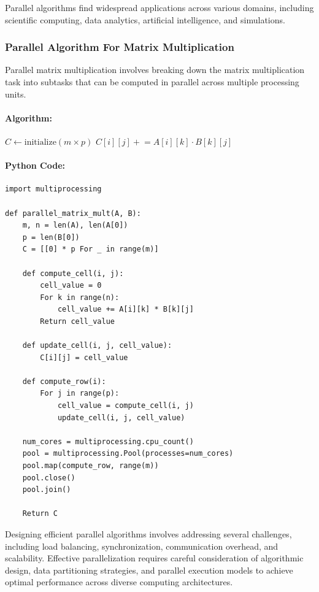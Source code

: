 \documentclass[12pt]{book} %
\begin{document}
Parallel algorithms find widespread applications across various domains, including scientific computing, data analytics, artificial intelligence, and simulations. 
\subsubsection{Parallel Algorithm For Matrix Multiplication}
\FloatBarrier
Parallel matrix multiplication involves breaking down the matrix multiplication task into subtasks that can be computed in parallel across multiple processing units.
\FloatBarrier
\paragraph{Algorithm:}
\FloatBarrier

\begin{algorithm}
\caption{Parallel Matrix Multiplication}
\begin{algorithmic}

    \State $C \gets \text{initialize}(m \times p)$
                \State $C[i][j] \mathrel{+}= A[i][k] \cdot B[k][j]$
            \EndFor
        \EndFor
    \EndFor
\EndFunction
\end{algorithmic}
\end{algorithm}
\FloatBarrier
\paragraph{Python Code:}
\FloatBarrier
\begin{verbatim}
import multiprocessing

def parallel_matrix_mult(A, B):
    m, n = len(A), len(A[0])
    p = len(B[0])
    C = [[0] * p For _ in range(m)]

    def compute_cell(i, j):
        cell_value = 0
        For k in range(n):
            cell_value += A[i][k] * B[k][j]
        Return cell_value

    def update_cell(i, j, cell_value):
        C[i][j] = cell_value

    def compute_row(i):
        For j in range(p):
            cell_value = compute_cell(i, j)
            update_cell(i, j, cell_value)

    num_cores = multiprocessing.cpu_count()
    pool = multiprocessing.Pool(processes=num_cores)
    pool.map(compute_row, range(m))
    pool.close()
    pool.join()

    Return C
\end{verbatim}
\FloatBarrier
Designing efficient parallel algorithms involves addressing several challenges, including load balancing, synchronization, communication overhead, and scalability. Effective parallelization requires careful consideration of algorithmic design, data partitioning strategies, and parallel execution models to achieve optimal performance across diverse computing architectures.
\end{document}
